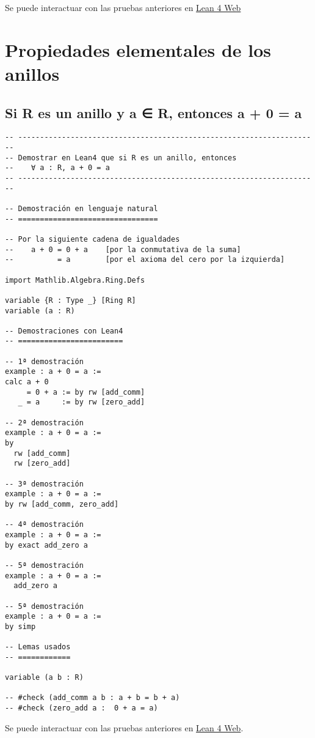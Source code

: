 Se puede interactuar con las pruebas anteriores en \href{https://lean.math.hhu.de/\#url=https://raw.githubusercontent.com/jaalonso/Calculemus2/main/src/Cuadrado\_igual\_a\_cuadrado.lean}{Lean 4 Web}

\chapter{Propiedades elementales de los anillos}
\label{sec:org0ecbcb4}

\section{Si R es un anillo y a ∈ R, entonces a + 0 = a}
\label{sec:org1f59a60}
\begin{verbatim}
-- ---------------------------------------------------------------------
-- Demostrar en Lean4 que si R es un anillo, entonces
--    ∀ a : R, a + 0 = a
-- ---------------------------------------------------------------------

-- Demostración en lenguaje natural
-- ================================

-- Por la siguiente cadena de igualdades
--    a + 0 = 0 + a    [por la conmutativa de la suma]
--          = a        [por el axioma del cero por la izquierda]

import Mathlib.Algebra.Ring.Defs

variable {R : Type _} [Ring R]
variable (a : R)

-- Demostraciones con Lean4
-- ========================

-- 1ª demostración
example : a + 0 = a :=
calc a + 0
     = 0 + a := by rw [add_comm]
   _ = a     := by rw [zero_add]

-- 2ª demostración
example : a + 0 = a :=
by
  rw [add_comm]
  rw [zero_add]

-- 3ª demostración
example : a + 0 = a :=
by rw [add_comm, zero_add]

-- 4ª demostración
example : a + 0 = a :=
by exact add_zero a

-- 5ª demostración
example : a + 0 = a :=
  add_zero a

-- 5ª demostración
example : a + 0 = a :=
by simp

-- Lemas usados
-- ============

variable (a b : R)

-- #check (add_comm a b : a + b = b + a)
-- #check (zero_add a :  0 + a = a)
\end{verbatim}
Se puede interactuar con las pruebas anteriores en \href{https://lean.math.hhu.de/\#url=https://raw.githubusercontent.com/jaalonso/Calculemus2/main/src/Suma\_con\_cero.lean}{Lean 4 Web}.


